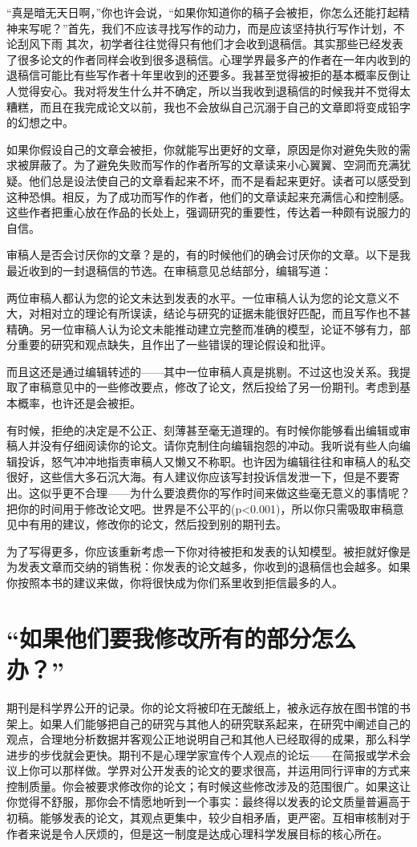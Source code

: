 “真是暗无天日啊，”你也许会说，“如果你知道你的稿子会被拒，你怎么还能打起精神来写呢？”首先，我们不应该寻找写作的动力，而是应该坚持执行写作计划，不论刮风下雨 其次，初学者往往觉得只有他们才会收到退稿信。其实那些已经发表了很多论文的作者同样会收到很多退稿信。心理学界最多产的作者在一年内收到的退稿信可能比有些写作者十年里收到的还要多。我甚至觉得被拒的基本概率反倒让人觉得安心。我对将发生什么并不确定，所以当我收到退稿信的时候我并不觉得太糟糕，而且在我完成论文以前，我也不会放纵自己沉溺于自己的文章即将变成铅字的幻想之中。

如果你假设自己的文章会被拒，你就能写出更好的文章，原因是你对避免失败的需求被屏蔽了。为了避免失败而写作的作者所写的文章读来小心翼翼、空洞而充满犹疑。他们总是设法使自己的文章看起来不坏，而不是看起来更好。读者可以感受到这种恐惧。相反，为了成功而写作的作者，他们的文章读起来充满信心和控制感。这些作者把重心放在作品的长处上，强调研究的重要性，传达着一种颇有说服力的自信。

审稿人是否会讨厌你的文章？是的，有的时候他们的确会讨厌你的文章。以下是我最近收到的一封退稿信的节选。在审稿意见总结部分，编辑写道：

{\kaishu 两位审稿人都认为您的论文未达到发表的水平。一位审稿人认为您的论文意义不大，对相对立的理论有所误读，结论与研究的证据未能很好匹配，而且写作也不甚精确。另一位审稿人认为论文未能推动建立完整而准确的模型，论证不够有力，部分重要的研究和观点缺失，且作出了一些错误的理论假设和批评。}

而且这还是通过编辑转述的——其中一位审稿人真是挑剔。不过这也没关系。我提取了审稿意见中的一些修改要点，修改了论文，然后投给了另一份期刊。考虑到基本概率，也许还是会被拒。

有时候，拒绝的决定是不公正、刻薄甚至毫无道理的。有时候你能够看出编辑或审稿人并没有仔细阅读你的论文。请你克制住向编辑抱怨的冲动。我听说有些人向编辑投诉，怒气冲冲地指责审稿人又懒又不称职。也许因为编辑往往和审稿人的私交很好，这些信大多石沉大海。有人建议你应该写封投诉信发泄一下，但是不要寄出。这似乎更不合理——为什么要浪费你的写作时间来做这些毫无意义的事情呢？把你的时间用于修改论文吧。世界是不公平的(p<0.001)，所以你只需吸取审稿意见中有用的建议，修改你的论文，然后投到别的期刊去。

为了写得更多，你应该重新考虑一下你对待被拒和发表的认知模型。被拒就好像是为发表文章而交纳的销售税：你发表的论文越多，你收到的退稿信也会越多。如果你按照本书的建议来做，你将很快成为你们系里收到拒信最多的人。



\section{“如果他们要我修改所有的部分怎么办？”}
期刊是科学界公开的记录。你的论文将被印在无酸纸上，被永远存放在图书馆的书架上。如果人们能够把自己的研究与其他人的研究联系起来，在研究中阐述自己的观点，合理地分析数据并客观公正地说明自己和其他人已经取得的成果，那么科学进步的步伐就会更快。期刊不是心理学家宣传个人观点的论坛——在简报或学术会议上你可以那样做。学界对公开发表的论文的要求很高，并运用同行评审的方式来控制质量。你会被要求修改你的论文；有时候这些修改涉及的范围很广。如果这让你觉得不舒服，那你会不情愿地听到一个事实：最终得以发表的论文质量普遍高于初稿。能够发表的论文，其观点更集中，较少自相矛盾，更严密。互相审核制对于作者来说是令人厌烦的，但是这一制度是达成心理科学发展目标的核心所在。

